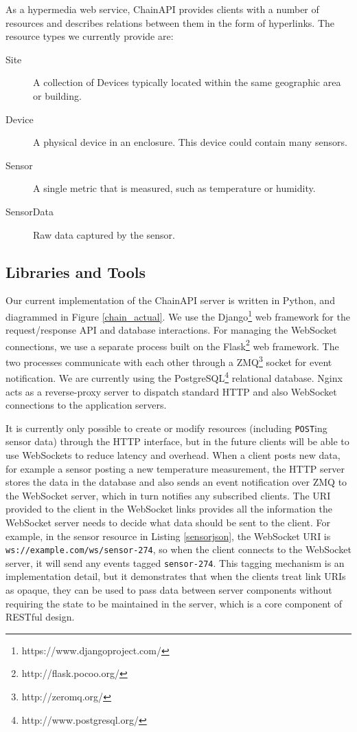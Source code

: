 \documentclass{acm_proc_article-sp}
\begin{document}
As a hypermedia web service, ChainAPI provides clients with a number of
resources and describes relations between them in the form of hyperlinks.  The
resource types we currently provide are:

\begin{description}
    \item[Site] A collection of Devices typically located within the same
        geographic area or building.
    \item[Device] A physical device in an enclosure. This device could contain
        many sensors.
    \item[Sensor] A single metric that is measured, such as temperature or humidity.
    \item[SensorData] Raw data captured by the sensor.
\end{description}

\subsection{Libraries and Tools}

Our current implementation of the ChainAPI server is written in Python, and
diagrammed in Figure \ref{chain_actual}. We use the
Django\footnote{https://www.djangoproject.com/} web framework for the
request/response API and database interactions. For managing the WebSocket
connections, we use a separate process built on the
Flask\footnote{http://flask.pocoo.org/} web framework. The two processes
communicate with each other through a ZMQ\footnote{http://zeromq.org/} socket
for event notification. We are currently using the
PostgreSQL\footnote{http://www.postgresql.org/} relational database. Nginx acts
as a reverse-proxy server to dispatch standard HTTP and also WebSocket
connections to the application servers.

It is currently only possible to create or modify resources (including
\texttt{POST}ing sensor data) through the HTTP interface, but in the future clients
will be able to use WebSockets to reduce latency and overhead. When a client
posts new data, for example a sensor posting a new temperature measurement, the
HTTP server stores the data in the database and also sends an event
notification over ZMQ to the WebSocket server, which in turn notifies any
subscribed clients. The URI provided to the client in the WebSocket links
provides all the information the WebSocket server needs to decide what data
should be sent to the client. For example, in the sensor resource in Listing
\ref{sensorjson}, the WebSocket URI is \texttt{ws://example.com/ws/sensor-274},
so when the client connects to the WebSocket server, it will send any events
tagged \texttt{sensor-274}. This tagging mechanism is an implementation detail,
but it demonstrates that when the clients treat link URIs as opaque, they can
be used to pass data between server components without requiring the state to
be maintained in the server, which is a core component of RESTful design.
\end{document}
